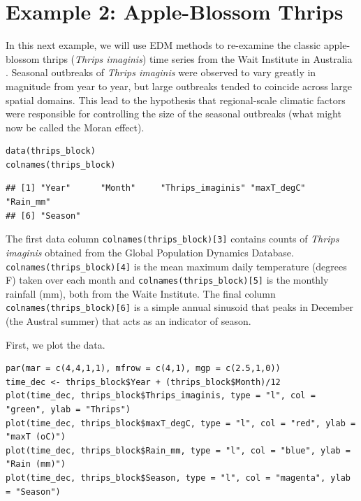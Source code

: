 \section{Example 2: Apple-Blossom Thrips}

In this next example, we will use EDM methods to re-examine the classic apple-blossom thrips (\emph{Thrips imaginis}) time series from the Wait Institute in Australia \cite{Davidson_1948, Davidson_1948a}. Seasonal outbreaks of \emph{Thrips imaginis} were observed to vary greatly in magnitude from year to year, but large outbreaks tended to coincide across large spatial domains. This lead to the hypothesis that regional-scale climatic factors were responsible for controlling the size of the seasonal outbreaks (what might now be called the Moran effect).

\begin{lstlisting}
data(thrips_block)
colnames(thrips_block)
\end{lstlisting}

\begin{lstlisting}[backgroundcolor=\color{white}, commentstyle=\ttfamily]
## [1] "Year"      "Month"     "Thrips_imaginis" "maxT_degC"     "Rain_mm"        
## [6] "Season" 
\end{lstlisting}

The first data column \lstinline{colnames(thrips_block)[3]} contains counts of \emph{Thrips imaginis} obtained from the Global Population Dynamics Database. \lstinline{colnames(thrips_block)[4]} is the mean maximum daily temperature (degrees F) taken over each month and \lstinline{colnames(thrips_block)[5]} is the monthly rainfall (mm), both from the Waite Institute. The final column \lstinline{colnames(thrips_block)[6]} is a simple annual sinusoid that peaks in December (the Austral summer) that acts as an indicator of season.

First, we plot the data.

\begin{lstlisting}
par(mar = c(4,4,1,1), mfrow = c(4,1), mgp = c(2.5,1,0))
time_dec <- thrips_block$Year + (thrips_block$Month)/12
plot(time_dec, thrips_block$Thrips_imaginis, type = "l", col = "green", ylab = "Thrips")
plot(time_dec, thrips_block$maxT_degC, type = "l", col = "red", ylab = "maxT (oC)")
plot(time_dec, thrips_block$Rain_mm, type = "l", col = "blue", ylab = "Rain (mm)")
plot(time_dec, thrips_block$Season, type = "l", col = "magenta", ylab = "Season")
\end{lstlisting}

